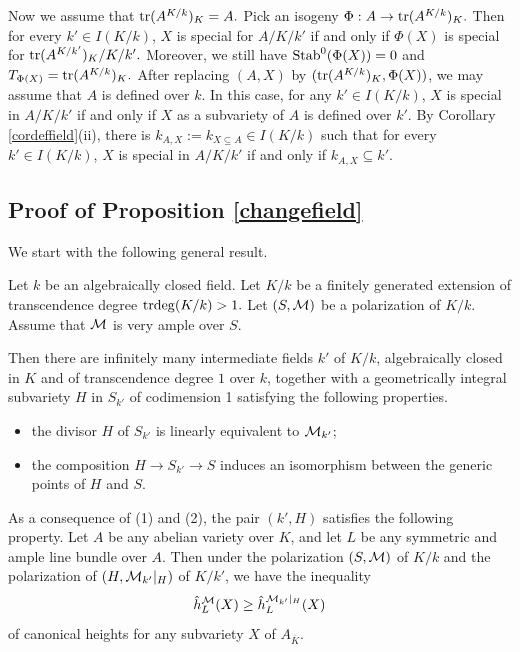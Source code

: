 Now we assume that ${\rm tr}(A^{K/k})_K= A.$ Pick an isogeny $\Phi: A\to {\rm tr}(A^{K/k})_K.$ Then for every $k'\in I(K/k)$,  $X$ is special for $A/K/k'$ if and only if $\Phi(X)$ is special for ${\rm tr}(A^{K/k'})_K/K/k'.$
Moreover, we still have ${\mathrm{Stab}}^0(\Phi(X))=0$ and $T_{\Phi(X)}={\rm tr}(A^{K/k})_K.$
After replacing $(A, X)$ by $({\rm tr}(A^{K/k})_K, \Phi(X))$, we may assume that $A$ is defined over $k.$
In this case, for any $k'\in I(K/k)$, $X$ is special in $A/K/k'$ if and only if  $X$ as a subvariety of $A$ is defined over $k'.$
By Corollary \ref{cordeffield}(ii), there is $k_{A,X}:=k_{X\subseteq A}\in I(K/k)$ such that for every $k'\in I(K/k)$, $X$ is special in $A/K/k'$
if and only if $k_{A,X}\subseteq k'$.
\endproof




\subsection{Proof of Proposition \ref{changefield}}



We start with the following general result.

\begin{lem}
\notready\label{generic hyperplane}
Let $k$ be an algebraically closed field.
Let $K/k$ be a finitely generated extension of transcendence degree ${\mathrm{trdeg}}(K/k)>1.$
Let $(S,{\mathcal M})$ be a polarization of $K/k$.
Assume that ${\mathcal M}$ is very ample over $S$.

Then there are infinitely many intermediate fields $k'$ of $K/k$, algebraically closed in $K$ and of transcendence degree $1$ over $k$, together with a geometrically integral subvariety $H$ in $S_{k'}$ of codimension 1 satisfying the following properties.
\begin{itemize}
\item[(1)]
the divisor $H$ of $S_{k'}$ is linearly equivalent to ${\mathcal M}_{k'}$;
\item[(2)]
the composition $H\to S_{k'} \to S$ induces an isomorphism between the generic points of $H$ and $S$.
\end{itemize}

As a consequence of (1) and (2), the pair $(k',H)$ satisfies the following property.
Let $A$ be any abelian variety over $K$, and let $L$ be any symmetric and ample line bundle over $A$.
Then under the polarization $(S,{\mathcal M})$ of $K/k$ and the polarization of $(H, {\mathcal M}_{k'}|_H)$ of $K/k'$, we have the inequality
$$
\hat h_L^{\mathcal M}(X)\geq \hat h_L^{{\mathcal M}_{k'}|_H}(X)
$$
of canonical heights for any subvariety $X$ of $A_{\overline{K}}.$
\end{lem}

